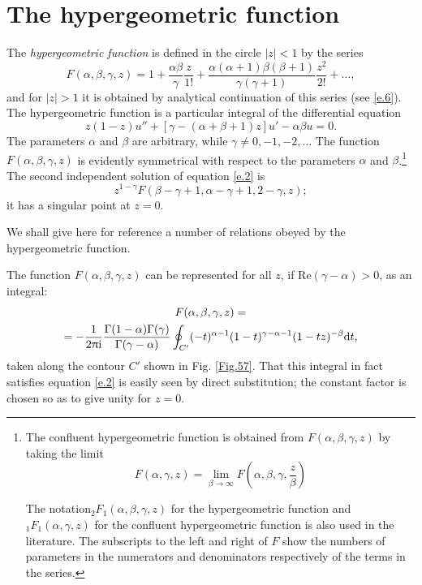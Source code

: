 \section{The hypergeometric function}\label{The hypergeometric function}
The \textit{hypergeometric function} is defined in the circle $ |z| < 1 $ by the series
\begin{equation}\label{e.1}
F(\alpha,\beta,\gamma,z)=1+\frac{\alpha\beta}{\gamma}\frac{z}{1!}+\frac{\alpha(\alpha+1)\beta(\beta+1)}{\gamma(\gamma+1)}\frac{z^2}{2!}+\dots,
\end{equation}
and for $ |z| > 1 $ it is obtained by analytical continuation of this series (see \eqref{e.6}). The hypergeometric function is a particular integral of the differential equation
\begin{equation}\label{e.2}
z(1-z)u''+[\gamma-(\alpha+\beta+1)z]u'-\alpha\beta u=0.
\end{equation}
The parameters $\alpha$ and $\beta$ are arbitrary, while $ γ \ne 0, -1, -2, \dots $ The function $ F (\alpha, \beta, \gamma, z) $ is evidently symmetrical with respect to the parameters $\alpha$ and $\beta$.\footnote{The confluent hypergeometric function is obtained from $ F (\alpha, \beta, \gamma, z) $ by taking the limit
\[ F (\alpha, \gamma, z)=\lim\limits_{\beta\to\infty}F (\alpha, \beta, \gamma, \frac{z}{\beta}) \]
	
	
	
The notation$ {}_2F_1(\alpha, \beta, \gamma, z) $ for the hypergeometric function and $ {}_1F_1(\alpha, \gamma, z) $ for the confluent hypergeometric function is also used in the literature. The subscripts to the left and right of $ F $ show the numbers of parameters in the numerators and denominators respectively of the terms in the series.
} The second independent solution of equation \eqref{e.2} is
\[ z^{1-\gamma}F(\beta-\gamma+1,\alpha-\gamma+1,2-\gamma,z); \]
it has a singular point at $ z = 0 $.

We shall give here for reference a number of relations obeyed by the hypergeometric function.

The function $ F (\alpha, \beta, \gamma, z) $ can be represented for all $ z $, if $ \mathrm{Re}(γ − α) > 0 $, as an integral:
\begin{multline}\label{e.3}
F(\alpha,\beta,\gamma,z)=\\
=-\frac{1}{2\uppi\mathrm{i}}\frac{\Gamma(1-\alpha)\Gamma(\gamma)}{\Gamma(\gamma-\alpha)}\oint_{C'}(-t)^{\alpha-1}(1-t)^{\gamma-\alpha-1}(1-tz)^{-\beta}\mathrm{d} t,
\end{multline}
taken along the contour $ C' $ shown in Fig. \ref{Fig.57}. That this integral in fact satisfies equation \eqref{e.2} is easily seen by direct substitution; the constant factor is chosen so as to give unity for $ z = 0 $.

